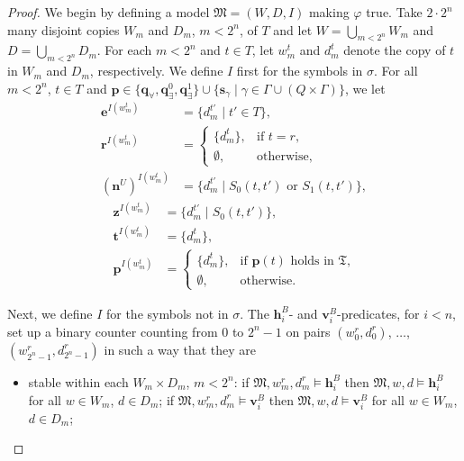 \documentclass[10pt,a4paper]{amsart}
\theoremstyle{plain}
\theoremstyle{definition}
\newcommand{\diag}{\fform{e}}
\newcommand{\fform}[1]{\boldsymbol{#1}}
\newcommand{\pvar}{\fform{p}}
\newcommand{\qvar}{\fform{q}}
\newcommand{\svar}{\fform{s}}
\newcommand{\hvar}{\fform{h}}
\newcommand{\vvar}{\fform{v}}
\newcommand{\Zvar}{\fform{z}}
\newcommand{\cR}{B}
\newcommand{\cU}{U}
\newcommand{\nextU}{\fform{n}^\cU}
\newcommand{\start}{\fform{r}}
\newcommand{\tree}{\fform{t}}
\newcommand{\qA}{\qvar_\forall}
\newcommand{\qE}{\qvar_\exists}
\newcommand{\treemod}{\mathfrak T}
\newcommand{\treedom}{T}
\newcommand{\treerel}{S}
\newcommand{\treet}{t}
\begin{document}
\begin{proof}
			
		We begin by defining a model $\mathfrak M=(W,D,I)$ making $\varphi$ true.
		Take $2\cdot 2^n$ many disjoint copies $W_m$ and $D_m$, $m<2^n$, of $\treedom$ and let
		$W=\bigcup_{m<2^n}W_m$ and $D=\bigcup_{m<2^n}D_m$. For each  $m<2^n$ and $\treet\in \treedom$, let
		$w_m^\treet$ and $d_m^\treet$ denote the copy of $\treet$ in $W_m$ and $D_m$, respectively.
		We define $I$ first for the symbols in $\sigma$. For all $m<2^n$, $\treet\in\treedom$ and
		$\pvar\in\{\qA,\qE^0,\qE^1\}\cup\{\svar_\gamma\mid\gamma\in\Gamma\cup(Q\times\Gamma)\}$, we let
		\begin{align}
			\label{Ifirst}
			\diag^{I(w_m^\treet)} & = \{d_m^{\treet'} \mid \treet' \in \treedom \},\\
			\start^{I(w_m^\treet)} & = \left\{
			\begin{array}{ll}
				\{d_m^{\treet}\}, & \mbox{if $\treet=r$,}\\[3pt]
				\emptyset, &\mbox{otherwise,}
			\end{array}
			\right.\\
			(\nextU)^{I(w_m^\treet)} & = \{d_m^{\treet'} \mid  \treerel_0(\treet,\treet')\mbox{ or } \treerel_1(\treet,\treet')\},%
\end{align}
\begin{align}
			\Zvar^{I(w_m^\treet)} & = \{d_m^{\treet'} \mid  \treerel_0(\treet,\treet') \},\\
			\tree^{I(w_m^\treet)} & = \{d_m^{\treet}\},\\
			\label{Ilast}
			\pvar^{I(w_m^\treet)} & = \left\{
			\begin{array}{ll}
				\{d_m^{\treet}\}, & \mbox{if $\pvar(\treet)$ holds in $\treemod$,}\\[3pt]
				\emptyset, &\mbox{otherwise.}
			\end{array}
			\right.
		\end{align}
		
		

		
		
		Next, we define $I$ for the symbols not in $\sigma$. The $\hvar^\cR_i$- and $\vvar^\cR_i$-predicates, for $i<n$, set up a binary counter counting from $0$ to $2^n\mathop{-}1$ on pairs $(w_0^r,d_0^r)$, $\dots$, $(w_{2^n-1}^r,d_{2^n-1}^r)$ in such a way
		that they are 
		\begin{itemize}
			\item[--]
			stable within each $W_m\times D_m$, $m<2^n$: 
			if $\mathfrak M,w_m^r,d_m^r\models\hvar^\cR_i$ then
			$\mathfrak M,w,d\models\hvar^\cR_i$ for all $w\in W_m$, $d\in D_m$;
			if $\mathfrak M,w_m^r,d_m^r\models\vvar^\cR_i$ then
			$\mathfrak M,w,d\models\vvar^\cR_i$ for all $w\in W_m$, $d\in D_m$;
			

\end{itemize}
\end{proof}
\end{document}

